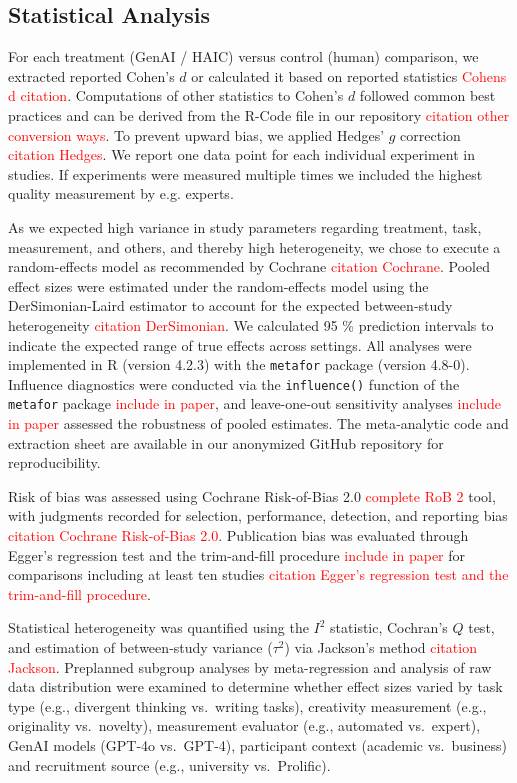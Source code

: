 \documentclass[manuscript, screen, review, acmsmall, anonymous]{acmart}
\newcommand{\TODO}[1]{\textcolor{red}{#1}}
\begin{document}
\subsection{Statistical Analysis}
\label{sec:StatAnalysis}

For each treatment (GenAI / HAIC) versus control (human) comparison, we extracted reported Cohen’s $d$ or calculated it based on reported statistics \TODO{Cohens d citation}. Computations of other statistics to Cohen’s $d$ followed common best practices and can be derived from the R-Code file in our repository \TODO{citation other conversion ways}. To prevent upward bias, we applied Hedges’ $g$ correction \cite{Hedges1985}\TODO{citation Hedges}. We report one data point for each individual experiment in studies. If experiments were measured multiple times we included the highest quality measurement by e.g. experts.

As we expected high variance in study parameters regarding treatment, task, measurement, and others, and thereby high heterogeneity, we chose to execute a random-effects model as recommended by Cochrane \TODO{citation Cochrane}. Pooled effect sizes were estimated under the random‐effects model using the DerSimonian-Laird estimator to account for the expected between‐study heterogeneity \cite{DerSimonian1986}\TODO{citation DerSimonian}. We calculated 95 \% prediction intervals to indicate the expected range of true effects across settings. All analyses were implemented in R (version 4.2.3) with the \texttt{metafor} package (version 4.8-0). Influence diagnostics were conducted via the \texttt{influence()} function of the \texttt{metafor} package \TODO{include in paper}, and leave-one-out sensitivity analyses \TODO{include in paper} assessed the robustness of pooled estimates. The meta‐analytic code and extraction sheet are available in our anonymized GitHub repository for reproducibility.

Risk of bias was assessed using Cochrane Risk-of-Bias 2.0 \TODO{complete RoB 2} tool, with judgments recorded for selection, performance, detection, and reporting bias \TODO{citation Cochrane Risk-of-Bias 2.0}. Publication bias was evaluated through Egger’s regression test and the trim-and-fill procedure \TODO{include in paper} for comparisons including at least ten studies \TODO{citation Egger’s regression test and the trim-and-fill procedure}.

Statistical heterogeneity was quantified using the $I^2$ statistic, Cochran’s $Q$ test, and estimation of between‐study variance ($\tau^2$) via Jackson’s method \TODO{citation Jackson}. Preplanned subgroup analyses by meta-regression and analysis of raw data distribution were examined to determine whether effect sizes varied by task type (e.g., divergent thinking vs.\ writing tasks), creativity measurement (e.g., originality vs.\ novelty), measurement evaluator (e.g., automated vs.\ expert), GenAI models (GPT-4o vs.\ GPT-4), participant context (academic vs.\ business) and recruitment source (e.g., university vs.\ Prolific).
\end{document}
